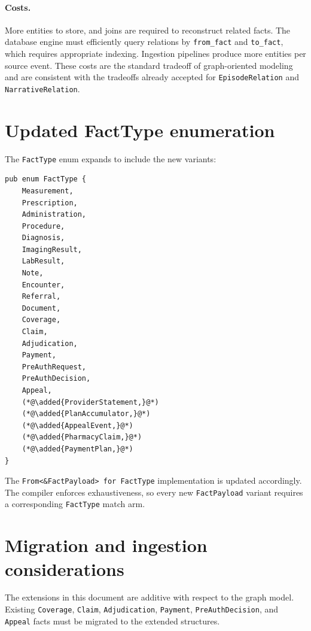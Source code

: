\documentclass[11pt]{article}
\newcommand{\added}[1]{\textcolor{accentblue}{#1}}
\begin{document}
\paragraph{Costs.}
More entities to store, and joins are required to reconstruct related
facts. The database engine must efficiently query relations by
\texttt{from\_fact} and \texttt{to\_fact}, which requires appropriate
indexing. Ingestion pipelines produce more entities per source event.
These costs are the standard tradeoff of graph-oriented modeling and
are consistent with the tradeoffs already accepted for
\texttt{EpisodeRelation} and \texttt{NarrativeRelation}.

\section{Updated FactType enumeration}

The \texttt{FactType} enum expands to include the new variants:

\begin{lstlisting}
pub enum FactType {
    Measurement,
    Prescription,
    Administration,
    Procedure,
    Diagnosis,
    ImagingResult,
    LabResult,
    Note,
    Encounter,
    Referral,
    Document,
    Coverage,
    Claim,
    Adjudication,
    Payment,
    PreAuthRequest,
    PreAuthDecision,
    Appeal,
    (*@\added{ProviderStatement,}@*)
    (*@\added{PlanAccumulator,}@*)
    (*@\added{AppealEvent,}@*)
    (*@\added{PharmacyClaim,}@*)
    (*@\added{PaymentPlan,}@*)
}
\end{lstlisting}

The \texttt{From<\&FactPayload> for FactType} implementation is updated
accordingly. The compiler enforces exhaustiveness, so every new
\texttt{FactPayload} variant requires a corresponding
\texttt{FactType} match arm.

\section{Migration and ingestion considerations}

The extensions in this document are additive with respect to the graph
model. Existing \texttt{Coverage}, \texttt{Claim}, \texttt{Adjudication},
\texttt{Payment}, \texttt{PreAuthDecision}, and \texttt{Appeal} facts
must be migrated to the extended structures.
\end{document}
